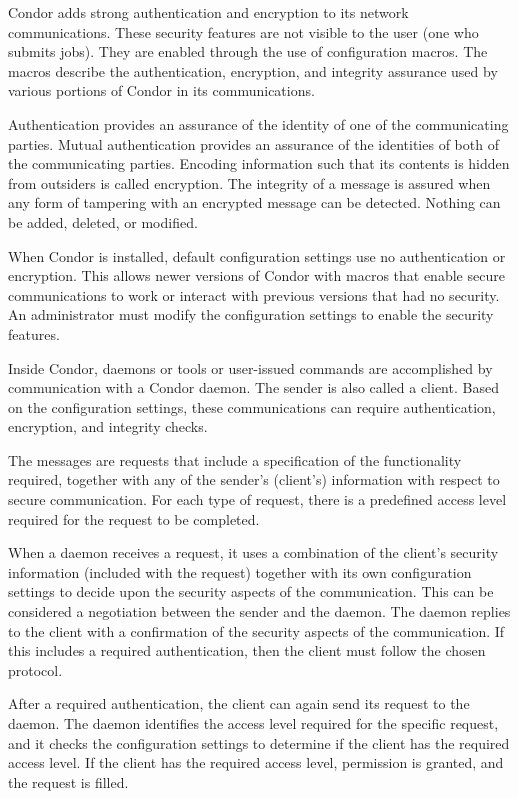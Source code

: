 Condor adds strong authentication and encryption to its network
communications.
These security features are not visible to the user (one who submits
jobs).
They are enabled through the use of configuration macros.
The macros describe the authentication, encryption, and
integrity assurance used by various portions of Condor in its communications.

Authentication provides an assurance of the identity of one of the
communicating parties.
Mutual authentication provides an assurance of the identities of
both of the communicating parties.
Encoding information such that its contents is hidden from outsiders
is called encryption.
The integrity of a message is assured when any form of
tampering with an encrypted message can be detected. 
Nothing can be added, deleted, or modified.

When Condor is installed, default configuration settings
use no authentication or encryption.
This allows newer versions of Condor with macros
that enable secure communications to work or interact
with previous versions that had no security.
An administrator must modify the configuration settings to
enable the security features.

Inside Condor, daemons or tools or user-issued commands
are accomplished by communication with a Condor daemon.
The sender is also called a client.
Based on the configuration settings,
these communications can require authentication, encryption,
and integrity checks.

The messages are requests that include
a specification of the functionality required,
together with any of the sender's (client's) information with
respect to secure communication.
For each type of request, there is a predefined access level
required for the request to be completed.

When a daemon receives a request,
it uses a combination of the client's security information
(included with the request)
together with its own configuration settings to decide upon
the security aspects of the communication.
This can be considered a negotiation between the sender and
the daemon.
The daemon replies to the client with a confirmation of
the security aspects of the communication.
If this includes a required authentication, then the
client must follow the chosen protocol.

After a required authentication, the client can again send its
request to the daemon. 
The daemon identifies the access level required for the specific
request,
and it checks the configuration settings to determine if the client 
has the required access level.
If the client has the required access level,
permission is granted, and the request is filled. 


